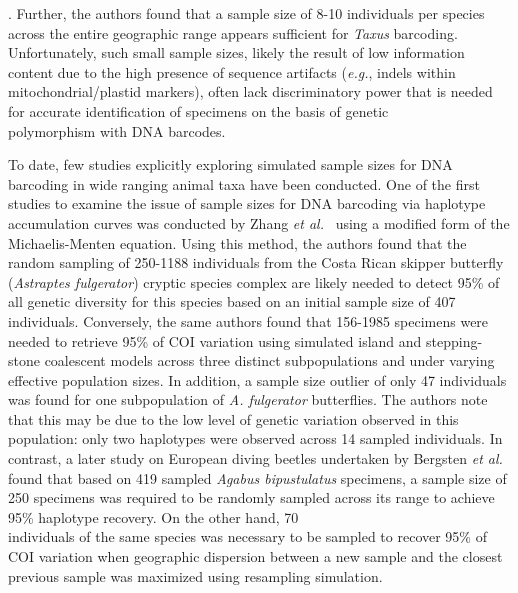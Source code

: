 \cite{liu2012sampling}. Further, the authors found that a sample size of 8-10 individuals per species across the entire geographic range appears sufficient for \textit{Taxus} barcoding. Unfortunately, such small sample sizes, likely the result of low information content due to the high presence of sequence artifacts (\textit{e.g.}, indels within mitochondrial/plastid markers), often lack discriminatory power that is needed for accurate identification of specimens on the basis of genetic \\ polymorphism with DNA barcodes.

 

To date, few studies explicitly exploring simulated sample sizes for DNA barcoding in wide ranging animal taxa have been conducted. One of the first studies to examine the issue of sample sizes for DNA barcoding via haplotype accumulation curves was conducted by Zhang \textit{et al.}~\cite{zhang2010estimating} using a modified form of the Michaelis-Menten equation. Using this method, the authors found that the random sampling of 250-1188 individuals from the Costa Rican skipper butterfly (\textit{Astraptes fulgerator}) cryptic species complex are likely needed to detect 95\% of all genetic diversity for this species based on an initial sample size of 407 individuals. Conversely, the same authors found that 156-1985 specimens were needed to retrieve 95\% of COI variation using simulated island \cite{wright1951genetical} and stepping-stone \cite{kimura1964stepping} coalescent models across three distinct subpopulations and under varying effective population sizes. In addition, a sample size outlier of only 47 individuals was found for one subpopulation of \textit{A. fulgerator} butterflies.  The authors note that this may be due to the low level of genetic variation observed in this population: only two haplotypes were observed across 14 sampled individuals. In contrast, a later study on European diving beetles undertaken by Bergsten \textit{et al.}~\cite{bergsten2012effect} found that based on 419 sampled \textit{Agabus bipustulatus} specimens, a sample size of 250 specimens was required to be randomly sampled across its range to achieve 95\% haplotype recovery. On the other hand, 70 \\ individuals of the same species was necessary to be sampled to recover 95\% of COI variation when geographic dispersion between a new sample and the closest previous sample was maximized using resampling simulation. 



